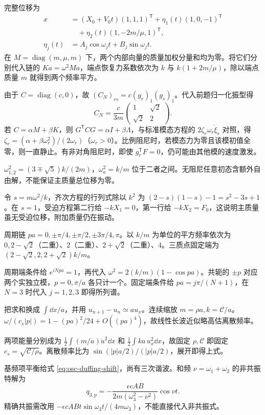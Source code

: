 \begin{bookexercises}
完整位移为
\begin{align*}
x&=(X_0+V_0t)(1,1,1)^{\mathsf T}
+\eta_1(t)(1,0,-1)^{\mathsf T}\\
&\quad+\eta_2(t)(1,-2m/\mu,1)^{\mathsf T},\\
\eta_j(t)&=A_j\cos\omega_jt+B_j\sin\omega_jt.
\end{align*}
在 $M=\operatorname{diag}(m,\mu,m)$ 下，两个内部向量的质量加权分量和均为零。将它们分别代入链的 $K a=\omega^2Ma$，端点恢复力系数依次为 $k$ 与 $k(1+2m/\mu)$，除以端点质量 $m$ 就得到两个频率平方。
\item 由于 $C=\operatorname{diag}(c,0)$，故 $(C_N)_{rs}=c(g_r)_1(g_s)_1$。代入前题归一化振型得
\[
C_N=\frac{c}{3m}\begin{pmatrix}1&\sqrt2\\\sqrt2&2\end{pmatrix}.
\]
若 $C=\alpha M+\beta K$，则 $G^{\mathsf T}CG=\alpha I+\beta\Lambda$，与标准模态方程的 $2\zeta_r\omega_r\dot\xi_r$ 对照，得 $\zeta_r=(\alpha+\beta\omega_r^2)/(2\omega_r)$（$\omega_r>0$）。比例阻尼时，若模态力为零且该模初值全零，则一直静止。有非对角阻尼时，即使 $g_r^{\mathsf T}F=0$，仍可能由其他模的速度激发。
\item $\omega_{1,2}^2=(3\mp\sqrt5)k/(2m)$，$\omega_a^2=k/m$ 位于二者之间。无阻尼任意初态含额外自由解，不能保证主质量总位移为零。

令 $s=m\omega^2/k$，齐次方程的行列式除以 $k^2$ 为 $(2-s)(1-s)-1=s^2-3s+1$。在 $s=1$，受迫方程第二行给 $-kX_1=0$，第一行给 $-kX_2=F_0$，这说明主质量虽无受迫位移，附加质量仍在振动。
\item 周期链 $pa=0,\pm\pi/4,\pm\pi/2,\pm3\pi/4,\pi$。以 $k/m$ 为单位的平方频率依次为 $0,2-\sqrt2$（二重）、$2$（二重）、$2+\sqrt2$（二重）、$4$。三质点固定端为 $(2-\sqrt2,2,2+\sqrt2)k/m$。

周期端条件给 $e^{iNpa}=1$，再代入 $\omega^2=2(k/m)(1-\cos pa)$。共轭的 $\pm p$ 对应两个实独立模，$p=0,\pi/a$ 各只计一个。固定端条件给 $pa=j\pi/(N+1)$，在 $N=3$ 时代入 $j=1,2,3$ 即得所列谱。
\item 把求和换成 $\int\dd x/a$，并用 $u_{n+1}-u_n\simeq au_x$。连续缩放 $m=\rho a,k=\mathcal C/a$。$\omega/(c_s|p|)=1-(pa)^2/24+O((pa)^4)$，故线性长波近似略高估离散频率。

两项能量分别成为 $\tfrac12\int (m/a)\dot u^2\dd x$ 和 $\tfrac12\int ka\,u_x^2\dd x$，故固定 $\rho,\mathcal C$ 即固定 $c_s=\sqrt{\mathcal C/\rho}$。离散频率比为 $\sin(|p|a/2)/(|p|a/2)$，展开即得上式。
\item 基频项平衡给式 \eqref{eq:osc-duffing-shift}，尚有三次谐波。和频 $\nu=\omega_1+\omega_2$ 的非共振特解为
\[q_{3,p}=-\frac{\epsilon cAB}{2m(\omega_3^2-\nu^2)}\cos\nu t.\]
精确共振需改用 $-\epsilon cABt\sin\omega_3t/(4m\omega_3)$，不能直接代入非共振式。


\end{bookexercises}
